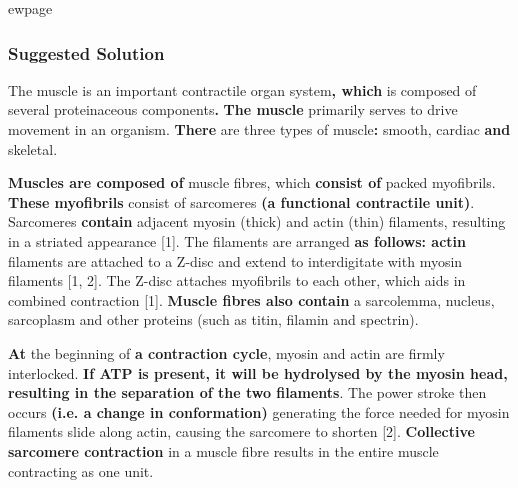 \documentclass{article}
\begin{document}
ewpage
\subsubsection*{Suggested Solution}

The muscle is an important contractile organ system\textbf{, which} is composed of several proteinaceous components\textbf{.} \textbf{The muscle }primarily serves to drive movement in an organism. \textbf{There} are three types of muscle\textbf{:} smooth, cardiac\textbf{ and }skeletal. 

\textbf{Muscles are composed of} muscle fibres, which \textbf{consist of }packed myofibrils. \textbf{These myofibrils }consist of sarcomeres \textbf{(a functional contractile unit)}. Sarcomeres \textbf{contain} adjacent myosin (thick) and actin (thin) filaments, resulting in a striated appearance [1]. The filaments are arranged \textbf{as follows: actin} filaments are attached to a Z-disc and extend to interdigitate with myosin filaments [1, 2]. The Z-disc attaches myofibrils to each other, which aids in combined contraction [1]. \textbf{Muscle fibres also contain} a sarcolemma, nucleus, sarcoplasm and other proteins (such as titin, filamin and spectrin).

\textbf{At} the beginning of \textbf{a contraction cycle}, myosin and actin are firmly interlocked. \textbf{If ATP is present, it will be hydrolysed by the myosin head, resulting in the separation of the two filaments}. The power stroke then occurs \textbf{(i.e. a change in conformation)} generating the force needed for myosin filaments slide along actin, causing the sarcomere to shorten [2]. \textbf{Collective sarcomere contraction} in a muscle fibre results in the entire muscle contracting as one unit. 
\end{document}
